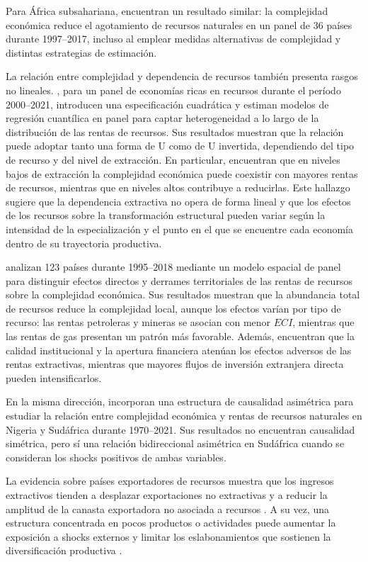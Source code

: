 \documentclass[../../TFM.tex]{subfiles}
\begin{document}
	Para África subsahariana, \textcite{Kelly2024} encuentran un resultado similar: la complejidad económica reduce el agotamiento de recursos naturales en un panel de 36 países durante 1997--2017, incluso al emplear medidas alternativas de complejidad y distintas estrategias de estimación.

	La relación entre complejidad y dependencia de recursos también presenta rasgos no lineales. \textcite{Ul-Durar2023}, para un panel de economías ricas en recursos durante el período 2000--2021, introducen una especificación cuadrática y estiman modelos de regresión cuantílica en panel para captar heterogeneidad a lo largo de la distribución de las rentas de recursos. Sus resultados muestran que la relación puede adoptar tanto una forma de U como de U invertida, dependiendo del tipo de recurso y del nivel de extracción. En particular, encuentran que en niveles bajos de extracción la complejidad económica puede coexistir con mayores rentas de recursos, mientras que en niveles altos contribuye a reducirlas. Este hallazgo sugiere que la dependencia extractiva no opera de forma lineal y que los efectos de los recursos sobre la transformación estructural pueden variar según la intensidad de la especialización y el punto en el que se encuentre cada economía dentro de su trayectoria productiva.

	\textcite{Zhang2023} analizan 123 países durante 1995--2018 mediante un modelo espacial de panel para distinguir efectos directos y derrames territoriales de las rentas de recursos sobre la complejidad económica. Sus resultados muestran que la abundancia total de recursos reduce la complejidad local, aunque los efectos varían por tipo de recurso: las rentas petroleras y mineras se asocian con menor $ECI$, mientras que las rentas de gas presentan un patrón más favorable. Además, encuentran que la calidad institucional y la apertura financiera atenúan los efectos adversos de las rentas extractivas, mientras que mayores flujos de inversión extranjera directa pueden intensificarlos.

	En la misma dirección, \textcite{Olaniyi-Odhiambo2025-2} incorporan una estructura de causalidad asimétrica para estudiar la relación entre complejidad económica y rentas de recursos naturales en Nigeria y Sudáfrica durante 1970--2021. Sus resultados no encuentran causalidad simétrica, pero sí una relación bidireccional asimétrica en Sudáfrica cuando se consideran los shocks positivos de ambas variables.
	
	La evidencia sobre países exportadores de recursos muestra que los ingresos extractivos tienden a desplazar exportaciones no extractivas y a reducir la amplitud de la canasta exportadora no asociada a recursos \parencite{Harding2016,Bahar2018}. A su vez, una estructura concentrada en pocos productos o actividades puede aumentar la exposición a shocks externos y limitar los eslabonamientos que sostienen la diversificación productiva \parencite{Bahar2018,Joya2015,Lashitew2021}.
	
\end{document}
